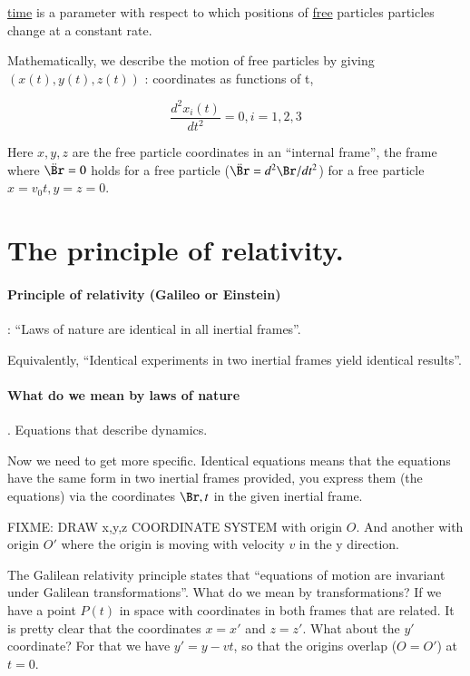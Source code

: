 \underline{time} is a parameter with respect to which positions of \underline{free} particles particles change at a constant rate.

Mathematically, we describe the motion of free particles by giving $(x(t), y(t), z(t))$ : coordinates as functions of t, 

\begin{equation}\label{eqn:relativisticElectrodynamicsL1:30}
\frac{d^2 x_i(t)}{dt^2} = 0, i = 1,2,3
\end{equation}

Here $x,y,z$ are the free particle coordinates in an ``internal frame'', the frame where $\ddot{\Br} = 0$ holds for a free particle ($\ddot{\Br} = d^2 \Br/dt^2 $) for a free particle $x = v_0 t, y = z = 0$.

\section{The principle of relativity.}

\paragraph{Principle of relativity (Galileo or Einstein)}: ``Laws of nature are identical in all inertial frames''.

Equivalently, ``Identical experiments in two inertial frames yield identical results''.

\paragraph{What do we mean by laws of nature}.  Equations that describe dynamics.

Now we need to get more specific.  Identical equations means that the equations have the same form in two inertial frames provided, you express them (the equations) via the coordinates $\Br,t$ in the given inertial frame.

FIXME: DRAW x,y,z COORDINATE SYSTEM with origin $O$.  And another with origin $O'$ where the origin is moving with velocity $v$ in the y direction.

The Galilean relativity principle states that ``equations of motion are invariant under Galilean transformations''.  What do we mean by transformations?  If we have a point $P(t)$ in space with coordinates in both frames that are related.  It is pretty clear that the coordinates $x = x'$ and $z = z'$.  What about the $y'$ coordinate?  For that we have $y' = y - v t$, so that the origins overlap ($O = O'$) at $t=0$.

